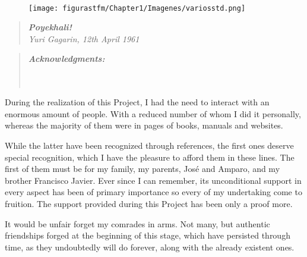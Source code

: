 

\textbf{\emph{\large }}\\
\vspace{4cm}

\begin{figure}[H]
	\centering
		\texttt{[image: figurastfm/Chapter1/Imagenes/variosstd.png]}
	\label{fig:vostok1}
\end{figure}

\begin{quotation}
\centering 
\textbf{\emph{Poyekhali!}}\\
\textit{{\emph{Yuri Gagarin, 12th April 1961}}}
\end{quotation}

\clearpage

\begin{quotation}
\noindent \begin{center}
\textbf{\emph{\Large Acknowledgments:}}\textbf{\emph{\large }}\\
\textbf{\emph{\large }}\\
\textbf{\emph{\large }}\\
\textbf{\emph{\large }}
\par\end{center}{\large \par}
\end{quotation}

During the realization of this Project, I had the need to interact with an enormous amount of people. With a reduced number of whom I did it personally, whereas the majority of them were in pages	of books, manuals and websites.

While the latter have been recognized through references, the first ones deserve special recognition, which I have the pleasure to afford them in these lines. The first of them must be for my family, my parents, José and Amparo, and my brother Francisco Javier. 	Ever since I can remember, its unconditional support in every aspect has been of primary importance so every of my undertaking come to fruition. The support provided during this Project has been only a proof more.

It would be unfair forget my comrades in arms. Not many, but authentic friendships forged at the beginning of this stage, which have persisted through time, as they undoubtedly will do forever, along with the already existent ones.

